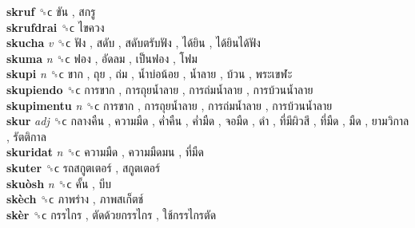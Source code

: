 \textbf{skruf} ␝ϲ   ขัน ,  สกรู   \\
\textbf{skrufdrai} ␝ϲ   ไขควง   \\
\textbf{skucha} \emph{v}  ␝ϲ   ฟัง ,  สดับ ,  สดับตรับฟัง ,  ได้ยิน ,  ได้ยินได้ฟัง   \\
\textbf{skuma} \emph{n}  ␝ϲ   ฟอง ,  อัดลม ,  เป็นฟอง ,  โฟม   \\
\textbf{skupi} \emph{n}  ␝ϲ   ขาก ,  ถุย ,  ถ่ม ,  น้ำบ่อน้อย ,  น้ำลาย ,  บ้วน ,  พระเขฬะ   \\
\textbf{skupiendo} ␝ϲ   การขาก ,  การถุยน้ำลาย ,  การถ่มน้ำลาย ,  การบ้วนน้ำลาย   \\
\textbf{skupimentu} \emph{n}  ␝ϲ   การขาก ,  การถุยน้ำลาย ,  การถ่มน้ำลาย ,  การบ้วนน้ำลาย   \\
\textbf{skur} \emph{adj}  ␝ϲ   กลางคืน ,  ความมืด ,  ค่ำคืน ,  ค่ำมืด ,  จอมืด ,  ดำ ,  ที่มีผิวสี ,  ที่มืด ,  มืด ,  ยามวิกาล ,  รัตติกาล   \\
\textbf{skuridat} \emph{n}  ␝ϲ   ความมืด ,  ความมืดมน ,  ที่มืด   \\
\textbf{skuter} ␝ϲ   รถสกูตเตอร์ ,  สกูตเตอร์   \\
\textbf{skuòsh} \emph{n}  ␝ϲ   คั้น ,  บีบ   \\
\textbf{skèch} ␝ϲ   ภาพร่าง ,  ภาพสเก็ตช์   \\
\textbf{skèr} ␝ϲ   กรรไกร ,  ตัดด้วยกรรไกร ,  ใช้กรรไกรตัด   \\
